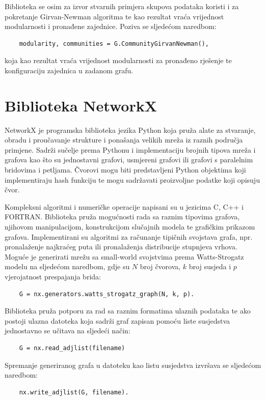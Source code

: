\documentclass[times, utf8, diplomski]{fer}
\begin{document}
Biblioteka se osim za izvor stvarnih primjera skupova podataka koristi i za pokretanje Girvan-Newman algoritma te kao rezultat vraća vrijednost modularnosti i pronađene zajednice. Poziva se sljedećom naredbom:
\begin{verbatim}
	modularity, communities = G.CommunityGirvanNewman(),
\end{verbatim} 
koja kao rezultat vraća vrijednost modularnosti za pronađeno rješenje te konfiguraciju zajednica u zadanom grafu.



\section{Biblioteka NetworkX}
NetworkX \cite{SciPyProceedings_11} je programska biblioteka jezika Python koja pruža alate za stvaranje, obradu i proučavanje strukture i ponašanja velikih mreža iz raznih područja primjene. Sadrži sučelje prema Pythonu i implementaciju brojnih tipova mreža i grafova kao što su jednostavni grafovi, usmjereni grafovi ili grafovi s paralelnim bridovima i petljama. Čvorovi mogu biti predstavljeni Python objektima koji implementiraju hash funkciju te mogu sadržavati proizvoljne podatke koji opisuju čvor.


Kompleksni algoritmi i numeričke operacije napisani su u jezicima C, C++ i FORTRAN. Biblioteka pruža mogućnosti rada sa raznim tipovima grafova, njihovom manipulacijom, konstrukcijom slučajnih modela te grafičkim prikazom grafova. Implementirani su algoritmi za računanje tipičnih svojstava grafa, npr. pronalaženje najkraćeg puta ili pronalaženja distribucije stupnjeva vrhova. Moguće je generirati mrežu sa small-world svojstvima prema Watts-Strogatz modelu na sljedećom naredbom, gdje su $N$ broj čvorova, $k$ broj susjeda i $p$ vjerojatnost prespajanja brida:
\begin{verbatim}
	G = nx.generators.watts_strogatz_graph(N, k, p).
\end{verbatim}
Biblioteka pruža potporu za rad sa raznim formatima ulaznih podataka te ako postoji ulazna datoteka koja sadrži graf zapisan pomoću liste susjedstva jednostavno se učitava na sljedeći način: 
\begin{verbatim}
	G = nx.read_adjlist(filename)
\end{verbatim}
Spremanje generiranog grafa u datoteku kao listu susjedstva izvršava se sljedećom naredbom:
\begin{verbatim}
	nx.write_adjlist(G, filename).
\end{verbatim}
\end{document}

